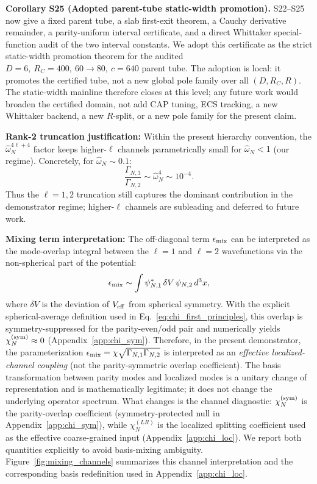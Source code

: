 \documentclass[aps,prd,onecolumn,notitlepage,nofootinbib,superscriptaddress,11pt,floatfix]{revtex4-2}
\begin{document}
\medskip\noindent\textbf{Corollary S25 (Adopted parent-tube static-width promotion).}
S22--S25 now give a fixed parent tube, a slab first-exit theorem, a Cauchy
derivative remainder, a parity-uniform interval certificate, and a direct
Whittaker special-function audit of the two interval constants.  We adopt this
certificate as the strict static-width promotion theorem for the audited
\(D=6,\ R_C=400,\ 60\to80,\ c=640\) parent tube.  The adoption is local: it
promotes the certified tube, not a new global pole family over all
\((D,R_C,R)\).  The static-width mainline therefore closes at this level; any
future work would broaden the certified domain, not add CAP tuning, ECS
tracking, a new Whittaker backend, a new \(R\)-split, or a new pole family for
the present claim.

\textbf{Rank-2 truncation justification:} Within the present hierarchy convention, the $\hat{\omega}_N^{4\ell+4}$ factor keeps higher-$\ell$ channels parametrically small for $\hat{\omega}_N < 1$ (our regime). Concretely, for $\hat{\omega}_N \sim 0.1$:
\begin{equation}
\frac{\Gamma_{N,3}}{\Gamma_{N,2}} \sim \hat{\omega}_N^4 \sim 10^{-4}.
\end{equation}
Thus the $\ell = 1,2$ truncation still captures the dominant contribution in the demonstrator regime; higher-$\ell$ channels are subleading and deferred to future work.

\textbf{Mixing term interpretation:} The off-diagonal term $\epsilon_{\rm mix}$ can be interpreted as the mode-overlap integral between the $\ell=1$ and $\ell=2$ wavefunctions via the non-spherical part of the potential:
\begin{equation}
\epsilon_{\rm mix} \sim \int \psi_{N,1}^* \, \delta V \, \psi_{N,2} \, d^3x,
\label{eq:epsilon_overlap}
\end{equation}
where $\delta V$ is the deviation of $V_{\rm eff}$ from spherical symmetry. With the explicit spherical-average definition used in Eq.~\eqref{eq:chi_first_principles}, this overlap is symmetry-suppressed for the parity-even/odd pair and numerically yields $\chi_N^{\rm(sym)}\approx 0$ (Appendix~\ref{app:chi_sym}). Therefore, in the present demonstrator, the parameterization $\epsilon_{\rm mix} = \chi\sqrt{\Gamma_{N,1}\Gamma_{N,2}}$ is interpreted as an \emph{effective localized-channel coupling} (not the parity-symmetric overlap coefficient).
The basis transformation between parity modes and localized modes is a unitary change of representation and is mathematically legitimate; it does not change the underlying operator spectrum. What changes is the channel diagnostic: $\chi_N^{\rm(sym)}$ is the parity-overlap coefficient (symmetry-protected null in Appendix~\ref{app:chi_sym}), while $\chi_N^{(LR)}$ is the localized splitting coefficient used as the effective coarse-grained input (Appendix~\ref{app:chi_loc}). We report both quantities explicitly to avoid basis-mixing ambiguity.
Figure~\ref{fig:mixing_channels} summarizes this channel interpretation and the corresponding basis redefinition used in Appendix~\ref{app:chi_loc}.
\end{document}
